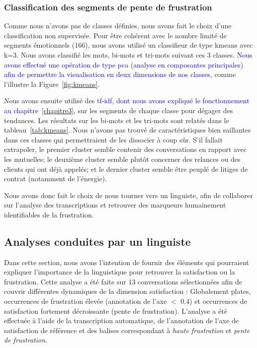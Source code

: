 \subsubsection{Classification des segments de pente de frustration}
Comme nous n'avons pas de classes définies, nous avons fait le choix d'une classification non supervisée. Pour être cohérent avec le nombre limité de segments émotionnels (166), nous avons utilisé un classifieur de type kmeans avec k=3. Nous avons classifié les mots, bi-mots et tri-mots suivant ces 3 classes. \textcolor{blue}{Nous avons effectué une opération de type pca (analyse en composantes principales) afin de permettre la visualisation en deux dimensions de nos classes,} comme l'illustre la Figure~\ref{fig:kmeans}.



Nous avons ensuite utilisé des \textcolor{blue}{tf-idf, dont nous avons expliqué le fonctionnement au chapitre~\ref{chapitre3},} sur les segments de chaque classe pour dégager des tendances. Les résultats sur les bi-mots et les tri-mots sont relatés dans le tableau~\ref{tab:kmeans}. Nous n'avons pas trouvé de caractéristiques bien saillantes dans ces classes qui permettraient de les dissocier à coup sûr. S'il fallait extrapoler, le premier cluster semble contenir des conversations en rapport avec les mutuelles; le deuxième cluster semble plutôt concerner des relances ou des clients qui ont déjà appelés; et le dernier cluster semble être peuplé de litiges de contrat (notamment de l'énergie).



Nous avons donc fait le choix de nous tourner vers un linguiste, afin de collaborer sur l'analyse des transcriptions et retrouver des marqueurs humainement identifiables de la frustration.


\subsection{Analyses conduites par un linguiste}
Dans cette section, nous avons l'intention de fournir des éléments qui pourraient expliquer l'importance de la linguistique pour retrouver la satisfaction ou la frustration.
Cette analyse a été faite sur 13 conversations sélectionnées afin de couvrir différentes dynamiques de la dimension satisfaction : Globalement plates, occurrences de frustration élevée (annotation de l'axe $<$ 0.4) et occurrences de satisfaction fortement décroissante (pente de frustration).
L'analyse a été effectuée à l'aide de la transcription automatique, de l'annotation de l'axe de satisfaction de référence et des balises correspondant à \textit{haute frustration} et \textit{pente de frustration}.

